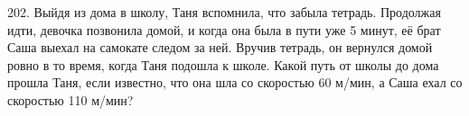202. Выйдя из дома в школу, Таня вспомнила, что забыла тетрадь. Продолжая идти, девочка позвонила домой, и когда она была в пути уже 5 минут, её брат Саша выехал на самокате следом за ней. Вручив тетрадь, он вернулся домой ровно в то время, когда Таня подошла к школе. Какой путь от школы до дома прошла Таня, если известно, что она шла со скоростью 60 м/мин, а Саша ехал со скоростью 110 м/мин?\\
